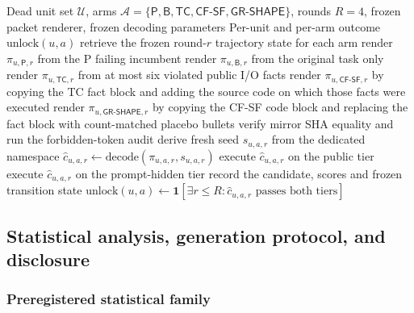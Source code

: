 \documentclass{article}
\numberwithin{equation}{section}  %
\theoremstyle{definition}
\newcommand{\armP}{\textsf{P}}
\newcommand{\armB}{\textsf{B}}
\newcommand{\armTC}{\textsf{TC}}
\newcommand{\armCF}{\textsf{CF-SF}}
\newcommand{\armGR}{\textsf{GR-SHAPE}}
\begin{document}
\begin{algorithm}[t]
\caption{Five-arm evaluation procedure. The procedure is not a repair algorithm, but an
evaluation instrument that measures the arm-level true-unlock outcome for each dead unit under
a matched output-generation budget.}
\label{alg:procedure}
\begin{algorithmic}[1]
\Require Dead unit set $\mathcal{U}$, arms
$\mathcal{A}=\{\armP,\armB,\armTC,\armCF,\armGR\}$, rounds $R=4$,
frozen packet renderer, frozen decoding parameters
\Ensure Per-unit and per-arm outcome $\mathrm{unlock}(u,a)$
    \State retrieve the frozen round-$r$ trajectory state for each arm
    \State render $\pi_{u,\armP,r}$ from the \armP{} failing incumbent
    \State render $\pi_{u,\armB,r}$ from the original task only
    \State render $\pi_{u,\armTC,r}$ from at most six violated public I/O facts
    \State render $\pi_{u,\armCF,r}$ by copying the \armTC{} fact block and
    adding the source code on which those facts were executed
    \State render $\pi_{u,\armGR,r}$ by copying the \armCF{} code block and
    replacing the fact block with count-matched placebo bullets
    \State verify mirror SHA equality and run the forbidden-token audit
      \State derive fresh seed $s_{u,a,r}$ from the dedicated namespace
      \State $\hat{c}_{u,a,r}\gets
      \mathrm{decode}(\pi_{u,a,r},s_{u,a,r})$
      \State execute $\hat{c}_{u,a,r}$ on the public tier
        \State execute $\hat{c}_{u,a,r}$ on the prompt-hidden tier
      \EndIf
      \State record the candidate, scores and frozen transition state
    \EndFor
  \EndFor
    \State $\mathrm{unlock}(u,a)\gets
    \mathbf{1}\!\left[\exists r\le R:
    \hat{c}_{u,a,r}\text{ passes both tiers}\right]$
  \EndFor
\EndFor
\end{algorithmic}
\end{algorithm}

\subsection{Statistical analysis, generation protocol, and disclosure}
\label{sec:analysis}

\subsubsection{Preregistered statistical family}
\label{sec:stats}
\end{document}

